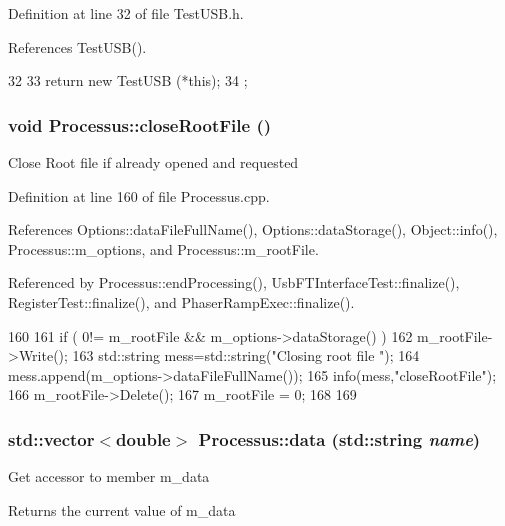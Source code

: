 Definition at line 32 of file TestUSB.h.

References TestUSB().


\begin{DoxyCode}
32                   {
33     return new TestUSB (*this);
34   };
\end{DoxyCode}
\hypertarget{classProcessus_a2f3c41e99da4c738ea3d8f7b0d20a665}{
\subsubsection[{closeRootFile}]{\setlength{\rightskip}{0pt plus 5cm}void Processus::closeRootFile ()}}
\label{classProcessus_a2f3c41e99da4c738ea3d8f7b0d20a665}
Close Root file if already opened and requested 

Definition at line 160 of file Processus.cpp.

References Options::dataFileFullName(), Options::dataStorage(), Object::info(), Processus::m\_\-options, and Processus::m\_\-rootFile.

Referenced by Processus::endProcessing(), UsbFTInterfaceTest::finalize(), RegisterTest::finalize(), and PhaserRampExec::finalize().


\begin{DoxyCode}
160                                 {
161   if ( 0!= m_rootFile && m_options->dataStorage() ){
162     m_rootFile->Write();
163         std::string mess=std::string("Closing root file ");
164         mess.append(m_options->dataFileFullName());
165         info(mess,"closeRootFile");
166     m_rootFile->Delete();
167     m_rootFile = 0;
168   }
169 }
\end{DoxyCode}
\hypertarget{classProcessus_abf4d91fb36707e1d50178bab12d21ae9}{
\subsubsection[{data}]{\setlength{\rightskip}{0pt plus 5cm}std::vector$<$double$>$ Processus::data (std::string {\em name})}}
\label{classProcessus_abf4d91fb36707e1d50178bab12d21ae9}
Get accessor to member m\_\-data \begin{DoxyReturn}{Returns}
the current value of m\_\-data 
\end{DoxyReturn}


